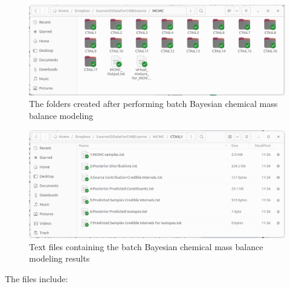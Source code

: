 \documentclass[12pt]{report}
\begin{document}
\begin{figure}[ht]
    \centering
    \includegraphics[width=14cm]{Figures/MCMC_folders.png} 
    \caption{The folders created after performing batch Bayesian chemical mass balance modeling}
    \label{fig:MCMC-folders}
\end{figure}
\FloatBarrier

\begin{figure}[ht]
    \centering
    \includegraphics[width=14cm]{Figures/MCMC_files.png} 
    \caption{Text files containing the batch Bayesian chemical mass balance modeling results}
    \label{fig:MCMC-files}
\end{figure}
\FloatBarrier

The files include: 
\end{document}
